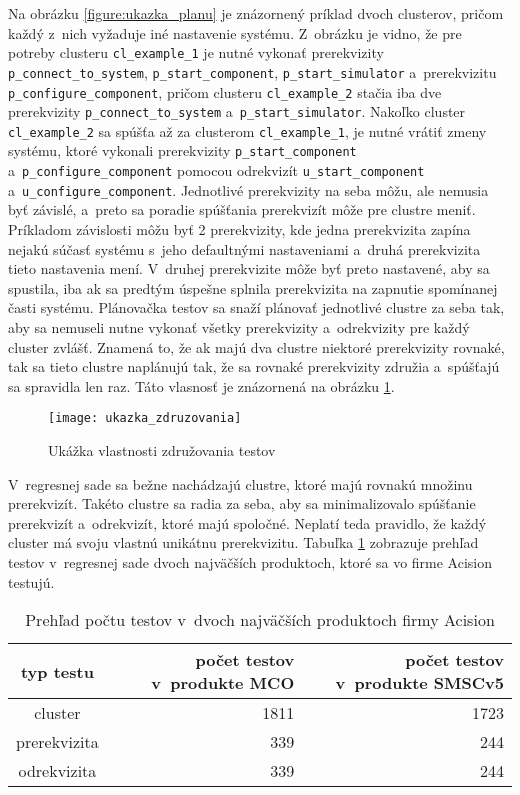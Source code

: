 Na obrázku \ref{figure:ukazka_planu} je znázornený príklad dvoch clusterov, pričom každý z~nich vyžaduje iné nastavenie systému. 
Z~obrázku je vidno, že pre potreby clusteru \texttt {cl\_example\_1} je nutné vykonať prerekvizity \texttt{p\_connect\_to\_system}, 
\texttt{p\_start\_component}, \texttt{p\_start\_simulator} a~prerekvizitu \texttt{p\_configure\_component},
pričom clusteru \texttt{cl\_example\_2} stačia iba dve prerekvizity \texttt{p\_connect\_to\_system} a~\texttt{p\_start\_simulator}.
Nakoľko cluster \texttt{cl\_example\_2} sa spúšťa až za clusterom \texttt{cl\_example\_1}, je nutné vrátiť zmeny systému, ktoré vykonali prerekvizity 
\texttt{p\_start\_component} a~\texttt{p\_configure\_component} pomocou odrekvizít \texttt{u\_start\_component} a~\texttt{u\_configure\_component}.
Jednotlivé prerekvizity na seba môžu, ale nemusia byť závislé, a~preto sa poradie spúšťania prerekvizít môže pre clustre meniť.
Príkladom závislosti môžu byť 2 prerekvizity, kde jedna prerekvizita zapína nejakú súčasť systému s~jeho defaultnými nastaveniami a~druhá prerekvizita 
tieto nastavenia mení. V~druhej prerekvizite môže byť preto nastavené, aby sa spustila, iba ak sa predtým úspešne splnila prerekvizita na zapnutie 
spomínanej časti systému.
Plánovačka testov sa snaží plánovať jednotlivé clustre za seba tak, aby sa nemuseli nutne vykonať všetky prerekvizity a~odrekvizity pre každý cluster zvlášť.
Znamená to, že ak majú dva clustre niektoré prerekvizity rovnaké, tak sa tieto clustre naplánujú tak, že sa rovnaké prerekvizity združia a~spúšťajú sa spravidla len raz. 
Táto vlasnosť je znázornená na obrázku \ref{figure:ukazka_zdruzovania}. 
\begin{figure}[h]
    \texttt{[image: ukazka\_zdruzovania]}
    \caption{Ukážka vlastnosti združovania testov}
    \label{figure:ukazka_zdruzovania}
\end{figure}

V~regresnej sade sa bežne nachádzajú clustre, ktoré majú rovnakú množinu prerekvizít. Takéto clustre sa radia za seba, aby sa minimalizovalo
spúšťanie prerekvizít a~odrekvizít, ktoré majú spoločné. Neplatí teda pravidlo, že každý cluster má svoju vlastnú unikátnu prerekvizitu.
Tabuľka \ref{table:pocet_testov} zobrazuje prehľad testov v~regresnej sade dvoch najväčších produktoch,
ktoré sa vo firme Acision testujú.

\begin{table}
  \begin{center}
    \begin{tabular}{| c | r | r |}
    \hline
    typ testu & počet testov v~produkte MCO & počet testov v~produkte SMSCv5 \\ \hline
    cluster & 1811 & 1723 \\ \hline
    prerekvizita & 339 & 244 \\ \hline
    odrekvizita & 339 & 244 \\
    \hline
    \end{tabular}
    \label{table:pocet_testov}
    \caption{Prehľad počtu testov v~dvoch najväčších produktoch firmy Acision}
  \end{center}
\end{table}


